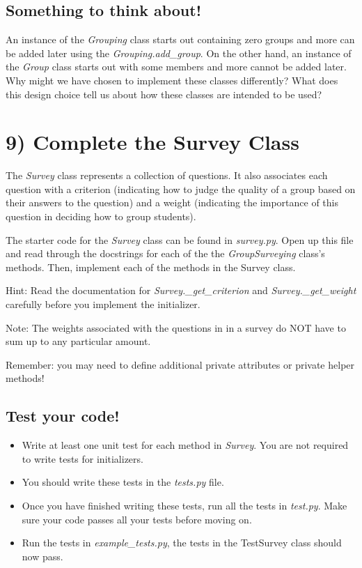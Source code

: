 \documentclass[12pt]{article}
\begin{document}
\subsection*{Something to think about!}
An instance of the \textit{Grouping} class starts out containing zero groups and
more can be added later using the \textit{Grouping.add\_group}. On the other
hand, an instance of the \textit{Group} class starts out with some members and more cannot
be added later. Why might we have chosen to implement these classes differently?
What does this design choice tell us about how these classes are intended to be used?

\section*{9) Complete the Survey Class}
The \textit{Survey} class represents a collection of questions. It also associates
each question with a criterion (indicating how to judge the quality of a group
based on their answers to the question) and a weight (indicating the importance
of this question in deciding how to group students).

\bigskip

\noindent The starter code for the \textit{Survey} class can be found in \textit{survey.py}.
Open up this file and read through the docstrings for each of the the \textit{GroupSurveying}
class’s methods. Then, implement each of the methods in the Survey class.

\bigskip

\noindent Hint: Read the documentation for \textit{Survey.\_get\_criterion} and
\textit{Survey.\_get\_weight} carefully before you implement the initializer.

\bigskip

\noindent Note: The weights associated with the questions in in a survey do NOT
have to sum up to any particular amount.

\noindent Remember: you may need to define additional private attributes or
private helper methods!

\subsection*{Test your code!}
\begin{itemize}
    \item Write at least one unit test for each method in \textit{Survey}. You are not required to write tests for initializers.
    \item You should write these tests in the \textit{tests.py} file.
    \item Once you have finished writing these tests, run all the tests in \textit{test.py}.
    Make sure your code passes all your tests before moving on.
    \item Run the tests in \textit{example\_tests.py}, the tests in the TestSurvey class should
    now pass.
\end{itemize}
\end{document}
